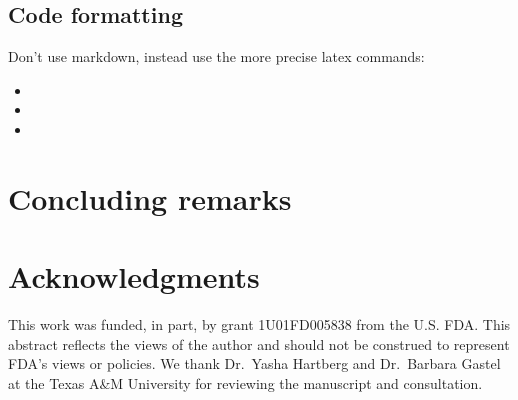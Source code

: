 \documentclass[article]{jss}
\begin{document}
\hypertarget{code-formatting}{%
\subsection{Code formatting}\label{code-formatting}}

Don't use markdown, instead use the more precise latex commands:

\begin{itemize}
\item
\item
\item
\end{itemize}

\hypertarget{concluding-remarks}{%
\section{Concluding remarks}\label{concluding-remarks}}

\hypertarget{acknowledgments}{%
\section{Acknowledgments}\label{acknowledgments}}

This work was funded, in part, by grant 1U01FD005838 from the U.S. FDA.
This abstract reflects the views of the author and should not be
construed to represent FDA's views or policies. We thank Dr.~Yasha
Hartberg and Dr.~Barbara Gastel at the Texas A\&M University for
reviewing the manuscript and consultation.
\end{document}
